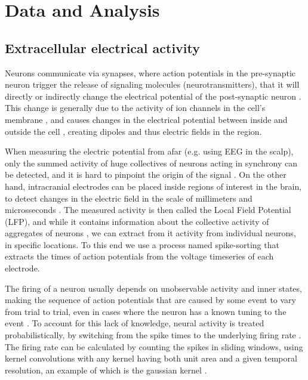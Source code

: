 
\section{Data and Analysis}
\label{sec:da}
\subsection{Extracellular electrical activity}
Neurons communicate via synapses, where action potentials in the pre-synaptic neuron trigger the release of signaling molecules (neurotransmitters), that it will directly or indirectly change the electrical potential of the post-synaptic neuron \cite{purves2014neuroscience}. This change is generally due to the activity of ion channels in the cell's membrane \cite{purves2014neuroscience}, and causes changes in the electrical potential between inside and outside the cell \cite{purves2014neuroscience}, creating dipoles and thus electric fields in the region.


When measuring the electric potential from afar (e.g. using EEG in the scalp), only the summed activity of huge collectives of neurons acting in synchrony can be detected, and it is hard to pinpoint the origin of the signal \cite{buzsaki2012origin}. On the other hand, intracranial electrodes can be placed inside regions of interest in the brain, to detect changes in the electric field in the scale of millimeters and microsseconds \cite{}. The measured activity is then called the Local Field Potential (LFP), and while it contains information about the collective activity of aggregates of neurons \cite{buzsaki2012origin}, we can extract from it activity from individual neurons, in specific locations. To this end we use a process named spike-sorting \cite{rey2015past} that extracts the times of action potentials from the voltage timeseries of each electrode. 

The firing of a neuron usually depends on unobservable activity and inner states, making the sequence of action potentials that are caused by some event to vary from trial to trial, even in cases where the neuron has a known tuning to the event \cite[p~7-8]{dayan2001theoretical}. To account for this lack of knowledge, neural activity is treated probabilistically, by switching from the spike times to the underlying firing rate \cite[p~9-11]{dayan2001theoretical}. The firing rate can be calculated by counting the spikes in sliding windows, using kernel convolutions with any kernel having both unit area and a given temporal resolution, an example of which is the gaussian kernel \cite[p~9-11]{dayan2001theoretical}.

